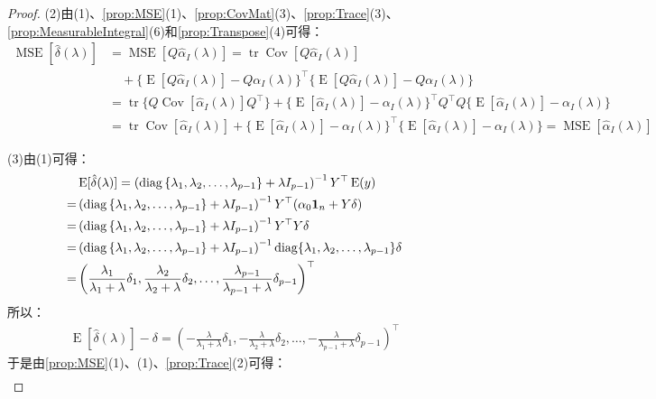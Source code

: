 \begin{proof}
	(2)由(1)、\cref{prop:MSE}(1)、\cref{prop:CovMat}(3)、\cref{prop:Trace}(3)、\cref{prop:MeasurableIntegral}(6)和\cref{prop:Transpose}(4)可得：
	\begin{align*}
		\operatorname{MSE}[\hat{\delta}(\lambda)]&=\operatorname{MSE}[Q\hat{\alpha}_I(\lambda)]=\operatorname{tr}\operatorname{Cov}[Q\hat{\alpha}_I(\lambda)] \\
		&\quad+\{\operatorname{E}[Q\hat{\alpha}_I(\lambda)]-Q\alpha_I(\lambda)\}^{\top}\{\operatorname{E}[Q\hat{\alpha}_I(\lambda)]-Q\alpha_I(\lambda)\} \\
		&=\operatorname{tr}\{Q\operatorname{Cov}[\hat{\alpha}_I(\lambda)]Q^{\top}\}+\{\operatorname{E}[\hat{\alpha}_I(\lambda)]-\alpha_I(\lambda)\}^{\top}Q^{\top}Q\{\operatorname{E}[\hat{\alpha}_I(\lambda)]-\alpha_I(\lambda)\} \\
		&=\operatorname{tr}\operatorname{Cov}[\hat{\alpha}_I(\lambda)]+\{\operatorname{E}[\hat{\alpha}_I(\lambda)]-\alpha_I(\lambda)\}^{\top}\{\operatorname{E}[\hat{\alpha}_I(\lambda)]-\alpha_I(\lambda)\}=\operatorname{MSE}[\hat{\alpha}_I(\lambda)]
	\end{align*}\par
	(3)由(1)可得：
	\begin{align*}
		&\operatorname{E}[\hat{\delta}(\lambda)]=\left(\operatorname{diag}\left\{\lambda_1, \lambda_2, \dots, \lambda_{p-1}\right\}+\lambda I_{p-1}\right)^{-1}Y^{\top}\operatorname{E}(y) \\
		=&\left(\operatorname{diag}\left\{\lambda_1, \lambda_2, \dots, \lambda_{p-1}\right\}+\lambda I_{p-1}\right)^{-1}Y^{\top}(\alpha_0\mathbf{1}_n+Y\delta) \\
		=&\left(\operatorname{diag}\left\{\lambda_1, \lambda_2, \dots, \lambda_{p-1}\right\}+\lambda I_{p-1}\right)^{-1}Y^{\top}Y\delta \\
		=&\left(\operatorname{diag}\left\{\lambda_1, \lambda_2, \dots, \lambda_{p-1}\right\}+\lambda I_{p-1}\right)^{-1}\operatorname{diag}\{\lambda_1, \lambda_2, \dots, \lambda_{p-1}\}\delta \\
		=&\left(\frac{\lambda_1}{\lambda_1+\lambda}\delta_1,\frac{\lambda_2}{\lambda_2+\lambda}\delta_2,\dots,\frac{\lambda_{p-1}}{\lambda_{p-1}+\lambda}\delta_{p-1}\right)^{\top}
	\end{align*}
	所以：
	\begin{gather*}
		\operatorname{E}[\hat{\delta}(\lambda)]-\delta=\left(-\frac{\lambda}{\lambda_1+\lambda}\delta_1,-\frac{\lambda}{\lambda_2+\lambda}\delta_2,\dots,-\frac{\lambda}{\lambda_{p-1}+\lambda}\delta_{p-1}\right)^{\top}
	\end{gather*}
	于是由\cref{prop:MSE}(1)、(1)、\cref{prop:Trace}(2)可得：
	\begin{gather*}

\end{gather*}
\end{proof}
